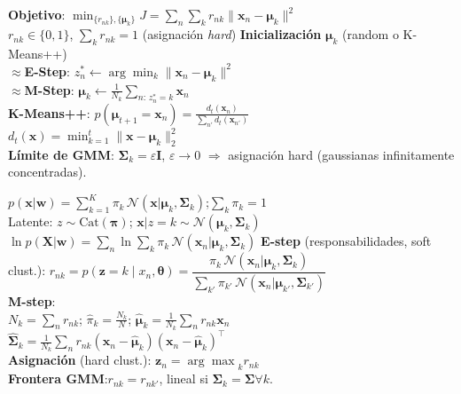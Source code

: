 \documentclass[10pt, a4paper]{article}
\newcommand{\w}{\mathbf{w}}
\newcommand{\x}{\mathbf{x}}
\newcommand{\X}{\mathbf{X}}
\newcommand{\z}{\mathbf{z}}
\newcommand{\muu}{\boldsymbol{\mu}}
\newcommand{\Sig}{\boldsymbol{\Sigma}}
\begin{document}
\noindent

\begin{minipage}[t]{0.3299\textwidth}
\vspace{0pt}

\begin{tcolorbox}[formulabox=K-Means, colframe=softRed]
    \textbf{Objetivo}: $\min_{\{r_{nk}\},\{\muu_k\}} J = \sum_n\sum_k r_{nk}\|\x_n - \muu_k\|^2$ \\
    $r_{nk} \in \{0,1\}$, $\sum_k r_{nk} = 1$ (asignación \textit{hard})
    \vspace{-2mm}
    \tcbline
    \vspace{-2mm}
    \textbf{Inicialización} $\muu_k$ (random o K-Means++) \\
    $\approx$\textbf{E-Step}: $z_n^* \leftarrow \arg\min_k \|\x_n - \muu_k\|^2$ \\
    $\approx$\textbf{M-Step}: $\muu_k \leftarrow \frac{1}{N_k}\sum_{n:\,z_n^*=k}\x_n$ \\
    \textbf{K-Means++}: $p(\muu_{t+1} =\x_n) = \frac{d_{t}(\x_n)}{\sum_{n'} d_t(\x_{n'})}$\\
    $d_t(\x)=\min^{t}_{k=1} \| \x - \muu_k\|^2_2$ \\
    \textbf{Límite de GMM}: $\Sig_k = \varepsilon\mathbf{I}$, $\varepsilon\to 0$ $\Rightarrow$ asignación hard (gaussianas infinitamente concentradas).
\end{tcolorbox}

\begin{tcolorbox}[formulabox=Gaussian Mixture Model (GMM), colframe=softRed]
    $p(\x|\w) = \sum_{k=1}^K \pi_k\,\mathcal{N}(\x|\muu_k,\Sig_k)$;\quad $\sum_k\pi_k=1$ \\
    Latente: $z \sim \text{Cat}(\boldsymbol{\pi})$; $\x|z=k \sim \mathcal{N}(\muu_k,\Sig_k)$\\
    $\ln p(\X|\w) = \sum_n \ln \sum_k \pi_k\,\mathcal{N}(\x_n|\muu_k,\Sig_k)$
    \vspace{-2mm}
    \tcbline
    \vspace{-2mm}
    \textbf{E-step} (responsabilidades, soft clust.):
    $r_{nk} = p(\z = k \mid x_n, \boldsymbol{\theta})= \dfrac{\pi_k\,\mathcal{N}(\x_n|\muu_k,\Sig_k)}{\sum_{k'}\pi_{k'}\,\mathcal{N}(\x_n|\muu_{k'},\Sig_{k'})}$\\[2pt]
    \textbf{M-step}:\\
    $N_k = \textstyle\sum_n r_{nk}$;\quad
    $\hat{\pi}_k = \tfrac{N_k}{N}$;\quad
    $\hat{\muu}_k = \tfrac{1}{N_k}\sum_n r_{nk}\x_n$\\
    $\hat{\Sig}_k = \tfrac{1}{N_k}\sum_n r_{nk}(\x_n{-}\hat{\muu}_k)(\x_n{-}\hat{\muu}_k)^\top$\\[2pt]
    \textbf{Asignación} (hard clust.): $\z_n = {\arg \max}_k r_{nk}$ \\
    \textbf{Frontera GMM}:$r_{nk} = r_{nk'}$, lineal si $\Sig_k=\Sig \forall k$.
\end{tcolorbox}


\end{minipage}
\end{document}
